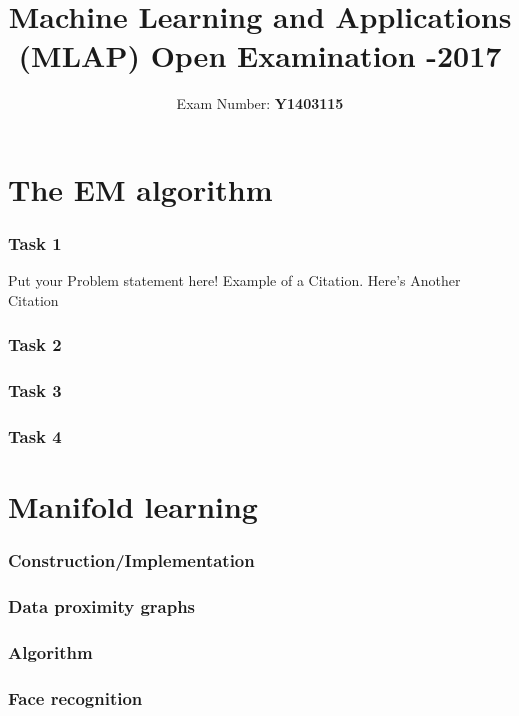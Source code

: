 \documentclass[a4paper, 11pt]{article}
\begin{document}
\title{\textbf {
Machine Learning and Applications (MLAP)
Open Examination -2017}}
\date{}
\author{Exam Number: \textbf{Y1403115}}
\maketitle


\part*{The EM algorithm}
\section{Task 1}
Put your Problem statement here! Example of a Citation\cite[p.219]{Robotics}. Here's Another Citation\cite{Flueck}

\section{Task 2}
\lipsum[2]

\section{Task 3}
\lipsum[3]

\section{Task 4}
\lipsum[4]

\part*{Manifold learning}
\section*{Construction/Implementation}
\lipsum[5]

\section*{Data proximity graphs}
\lipsum[6]

\section*{Algorithm}
\lipsum[7]

\section*{Face recognition}



\end{document}
